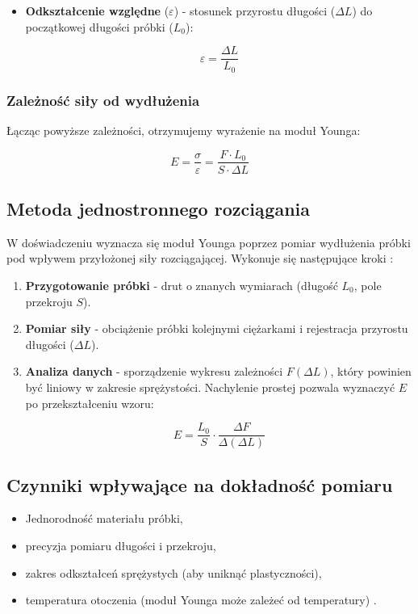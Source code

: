 \documentclass{article}
\begin{document}
{\begin{itemize}
    \begin{equation}
        \sigma = \frac{F}{S}
    \end{equation}

    \item \textbf{Odkształcenie względne} ($\varepsilon$) - stosunek przyrostu długości ($\Delta L$) do początkowej długości próbki ($L_0$):

    \begin{equation}
        \varepsilon = \frac{\Delta L}{L_0}
    \end{equation}
\end{itemize}

\subsubsection*{Zależność siły od wydłużenia}
Łącząc powyższe zależności, otrzymujemy wyrażenie na moduł Younga:

\begin{equation}
    E = \frac{\sigma}{\varepsilon} = \frac{F \cdot L_0}{S \cdot \Delta L}
\end{equation}

\subsection*{Metoda jednostronnego rozciągania}
W doświadczeniu wyznacza się moduł Younga poprzez pomiar wydłużenia próbki pod wpływem przyłożonej siły rozciągającej. Wykonuje się następujące kroki \cite{banasik}:

\begin{enumerate}
    \item \textbf{Przygotowanie próbki} - drut o znanych wymiarach (długość $L_0$, pole przekroju $S$).
    \item \textbf{Pomiar siły} - obciążenie próbki kolejnymi ciężarkami i rejestracja przyrostu długości ($\Delta L$).
    \item \textbf{Analiza danych} - sporządzenie wykresu zależności $F(\Delta L)$, który powinien być liniowy w zakresie sprężystości. Nachylenie prostej pozwala wyznaczyć $E$ po przekształceniu wzoru:

    \begin{equation}
        E = \frac{L_0}{S} \cdot \frac{\Delta F}{\Delta (\Delta L)}
    \end{equation}
\end{enumerate}

\subsection*{Czynniki wpływające na dokładność pomiaru}
\begin{itemize}
    \item Jednorodność materiału próbki,
    \item precyzja pomiaru długości i przekroju,
    \item zakres odkształceń sprężystych (aby uniknąć plastyczności),
    \item temperatura otoczenia (moduł Younga może zależeć od temperatury) \cite{szczeniowski}.
\end{itemize}

}
\end{document}
